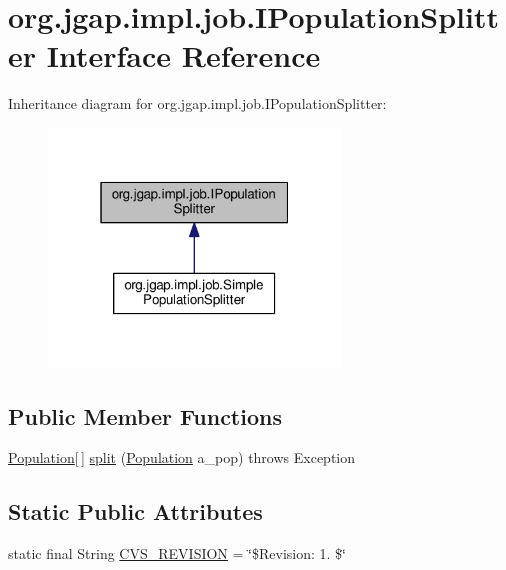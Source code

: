 \hypertarget{interfaceorg_1_1jgap_1_1impl_1_1job_1_1_i_population_splitter}{\section{org.\-jgap.\-impl.\-job.\-I\-Population\-Splitter Interface Reference}
\label{interfaceorg_1_1jgap_1_1impl_1_1job_1_1_i_population_splitter}
}


Inheritance diagram for org.\-jgap.\-impl.\-job.\-I\-Population\-Splitter\-:
\nopagebreak
\begin{figure}[H]
\begin{center}
\leavevmode
\includegraphics[width=220pt]{interfaceorg_1_1jgap_1_1impl_1_1job_1_1_i_population_splitter__inherit__graph}
\end{center}
\end{figure}
\subsection*{Public Member Functions}
\begin{DoxyCompactItemize}
\item 
\hyperlink{classorg_1_1jgap_1_1_population}{Population}\mbox{[}$\,$\mbox{]} \hyperlink{interfaceorg_1_1jgap_1_1impl_1_1job_1_1_i_population_splitter_a1070d46577aeeaca485b9414650938d7}{split} (\hyperlink{classorg_1_1jgap_1_1_population}{Population} a\-\_\-pop)  throws Exception 
\end{DoxyCompactItemize}
\subsection*{Static Public Attributes}
\begin{DoxyCompactItemize}
\item 
static final String \hyperlink{interfaceorg_1_1jgap_1_1impl_1_1job_1_1_i_population_splitter_ad8f8dafa3a3e1ef076e7c3e2efa05f93}{C\-V\-S\-\_\-\-R\-E\-V\-I\-S\-I\-O\-N} = \char`\"{}\$Revision\-: 1. \$\char`\"{}
\end{DoxyCompactItemize}


